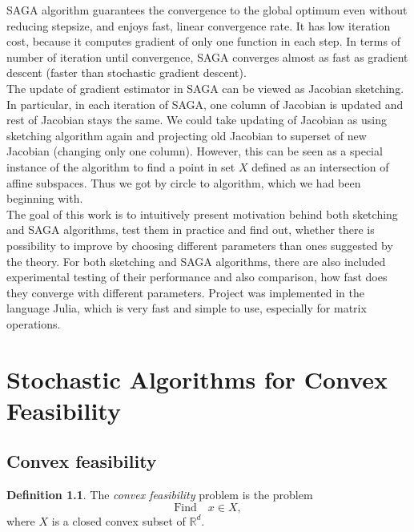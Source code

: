 \documentclass[11pt]{book}
\newcommand{\R}{\mathbb{R}}
\theoremstyle{definition}
\newtheorem{definition}[theorem]{Definition}
\begin{document}
	SAGA algorithm guarantees the convergence to the global optimum even without reducing stepsize, and enjoys fast, linear convergence rate. It has low iteration cost, because it computes gradient of only one function in each step. In terms of number of iteration until convergence, SAGA converges almost as fast as gradient descent (faster than stochastic gradient descent)\cite{SAGA}.\\
	
	The update of gradient estimator in SAGA can be viewed as Jacobian sketching. In particular, in each iteration of SAGA, one column of Jacobian is updated and rest of Jacobian stays the same. We could take updating of Jacobian as using sketching algorithm again and projecting old Jacobian to superset of new Jacobian (changing only one column). However, this can be seen as a special instance of the algorithm to find a point in set $X$ defined as an intersection of affine subspaces. Thus we got by circle to algorithm, which we had been beginning with.\\
	
	The goal of this work is to intuitively present motivation behind both sketching and SAGA algorithms, test them in practice and find out, whether there is possibility to improve by choosing different parameters than ones suggested by the theory. For both sketching and SAGA algorithms, there are also included experimental testing of their performance and also comparison, how fast does they converge with different parameters. Project was implemented in the language Julia, which is very fast and simple to use, especially for matrix operations.
	
	\chapter{Stochastic Algorithms for Convex Feasibility}
	
	\section{Convex feasibility}
	
	\begin{definition} The {\em convex feasibility} problem is the problem \begin{equation}\label{eq:proj_problem}
		\text{Find} \quad x \in X,\end{equation}
		where $X$ is a closed convex subset of $\R^d$.
	\end{definition}
	
\end{document}
